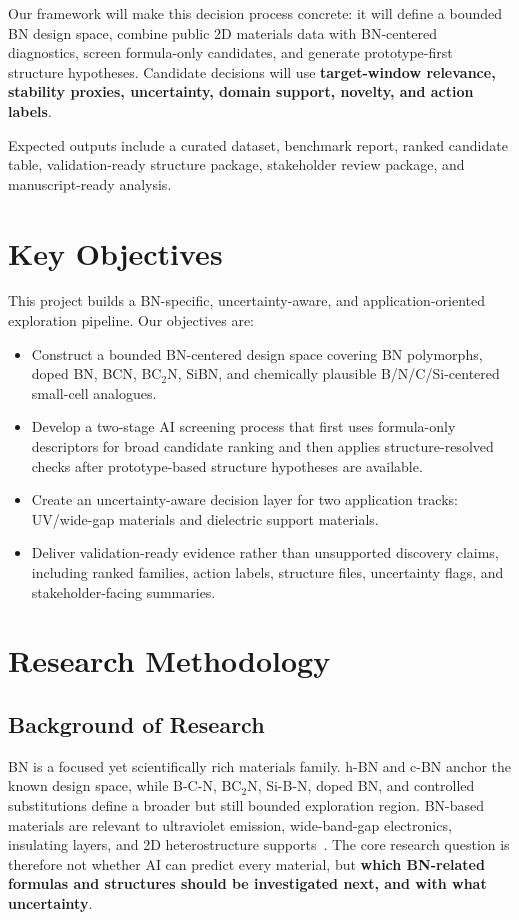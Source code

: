 \documentclass[12pt,a4paper]{article}
\begin{document}
Our framework will make this decision process concrete: it will define a bounded BN design space, combine public 2D materials data with BN-centered diagnostics, screen formula-only candidates, and generate prototype-first structure hypotheses. Candidate decisions will use \textbf{target-window relevance, stability proxies, uncertainty, domain support, novelty, and action labels}.

Expected outputs include a curated dataset, benchmark report, ranked candidate table, validation-ready structure package, stakeholder review package, and manuscript-ready analysis.

\vspace{-10pt}
\section{Key Objectives}
\vspace{-10pt}
This project builds a BN-specific, uncertainty-aware, and application-oriented exploration pipeline. Our objectives are:
\begin{itemize}[leftmargin=*]
\item Construct a bounded BN-centered design space covering BN polymorphs, doped BN, BCN, BC$_2$N, SiBN, and chemically plausible B/N/C/Si-centered small-cell analogues.
\item Develop a two-stage AI screening process that first uses formula-only descriptors for broad candidate ranking and then applies structure-resolved checks after prototype-based structure hypotheses are available.
\item Create an uncertainty-aware decision layer for two application tracks: UV/wide-gap materials and dielectric support materials.
\item Deliver validation-ready evidence rather than unsupported discovery claims, including ranked families, action labels, structure files, uncertainty flags, and stakeholder-facing summaries.
\end{itemize}

\vspace{-20pt}
\section{Research Methodology}
\vspace{-10pt}
\subsection{Background of Research}
BN is a focused yet scientifically rich materials family. h-BN and c-BN anchor the known design space, while B-C-N, BC$_2$N, Si-B-N, doped BN, and controlled substitutions define a broader but still bounded exploration region. BN-based materials are relevant to ultraviolet emission, wide-band-gap electronics, insulating layers, and 2D heterostructure supports~\cite{watanabe2004_hbn_uv,cassabois2016_hbn_indirect,dean2010_hbn_graphene}. The core research question is therefore not whether AI can predict every material, but \textbf{which BN-related formulas and structures should be investigated next, and with what uncertainty}.
\end{document}
